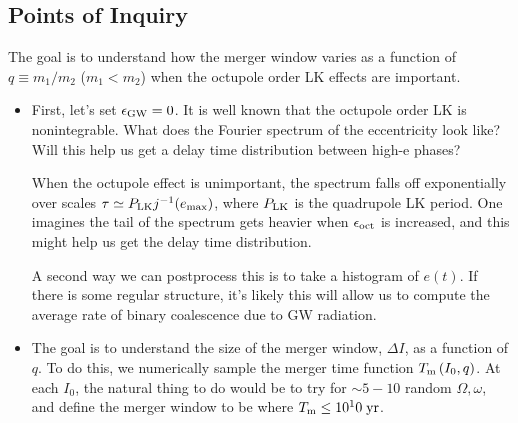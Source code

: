 \documentclass[10pt,
        twocolumn,
        fleqn,
    ]{revtex4-2}%
\newcommand*{\p}[1]{\left(#1\right)}
\begin{document}
\subsection{Points of Inquiry}

The goal is to understand how the merger window varies as a function of $q
\equiv m_1 / m_2$ ($m_1 < m_2$) when the octupole order LK effects are
important.
\begin{itemize}
    \item First, let's set $\epsilon_{\rm GW} = 0$. It is well known that the
        octupole order LK is nonintegrable. What does the Fourier spectrum of
        the eccentricity look like? Will this help us get a delay time
        distribution between high-e phases?

        When the octupole effect is unimportant, the spectrum falls off
        exponentially over scales $\tau \simeq P_{\rm LK} j^{-1}(e_{\max})$,
        where $P_{\rm LK}$ is the quadrupole LK period. One imagines the
        tail of the spectrum gets heavier when $\epsilon_{\rm oct}$ is
        increased, and this might help us get the delay time distribution.

        A second way we can postprocess this is to take a histogram of $e(t)$.
        If there is some regular structure, it's likely this will allow us to
        compute the average rate of binary coalescence due to GW radiation.

    \item The goal is to understand the size of the merger window, $\Delta I$,
        as a function of $q$. To do this, we numerically sample the merger time
        function $T_{\rm m}\p{I_0, q}$. At each $I_0$, the natural thing to do
        would be to try for $\sim 5-10$ random $\Omega, \omega$, and define the
        merger window to be where $T_{\rm m} \leq 10^10\;\mathrm{yr}$.
\end{itemize}
\end{document}
